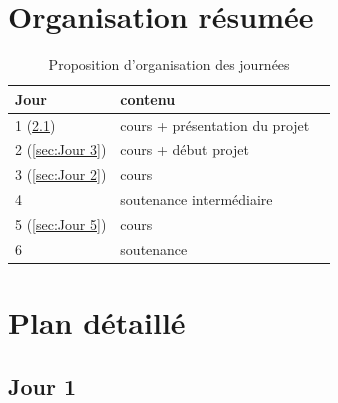 \documentclass[
10pt, %
a4paper, %
oneside, %
headinclude,footinclude, %
BCOR5mm, %
]{scrartcl}
\title{\normalfont{Module Machine learning 2025-2026}}
\author{\spacedlowsmallcaps{Nicolas Le Hir}
\\ \href{mailto:nicolaslehir@gmail.com}{nicolas.lehir@epitech.eu} 
}
\date{}
\begin{document}
\renewcommand{\sectionmark}[1]{\markright{\spacedlowsmallcaps{#1}}}
\lehead{\mbox{\llap{\small\thepage\kern1em\color{halfgray} \vline}\color{halfgray}\hspace{0.5em}\rightmark\hfil}} 
\pagestyle{scrheadings}
\maketitle 
\setcounter{tocdepth}{3} 

\tableofcontents

\section{\large{\color{Blue}Organisation résumée}}

\begin{table}[h!]
  \centering
\begin{tabular}{|l|l|l|}
   \hline
    Jour &  contenu \\
   \hline
    1 (\ref{sec:Jour 1})  & cours + présentation du projet  \\
   \hline
    2 (\ref{sec:Jour 3})  & cours + début projet  \\
   \hline
    3 (\ref{sec:Jour 2})  & cours \\
   \hline
    4  & soutenance intermédiaire \\
   \hline
    5 (\ref{sec:Jour 5}) & cours \\
   \hline
    6  & soutenance  \\
   \hline
\end{tabular}
  \caption{Proposition d'organisation des journées}
    \label{tab:sometab}
\end{table}


\section{\large{\color{Blue}Plan détaillé}}

\subsection{\large{Jour 1}}%
\label{sec:Jour 1}

\end{document}
